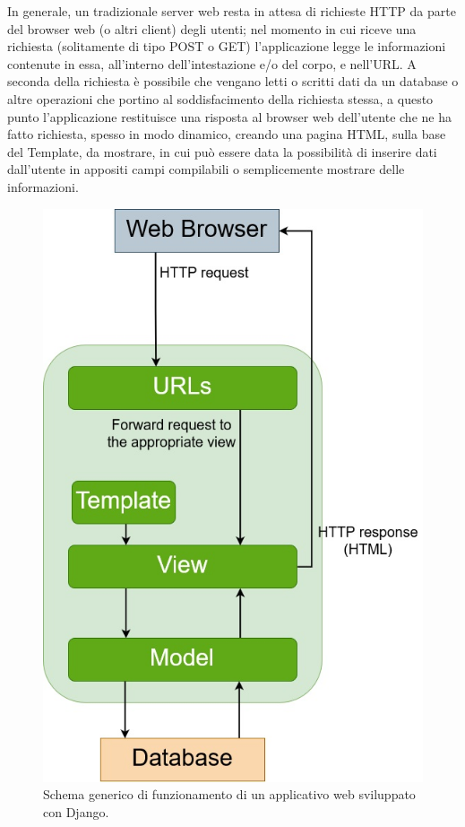 In generale, un tradizionale server web resta in attesa di richieste HTTP da parte del browser web (o altri client) degli utenti; nel momento in cui riceve 
una richiesta (solitamente di tipo POST o GET) 
l'applicazione legge le informazioni contenute in essa, all'interno dell'intestazione e/o del corpo, e nell'URL. A seconda della richiesta è possibile che 
vengano letti o scritti dati da un database o altre operazioni che portino al soddisfacimento della richiesta stessa, a questo punto l'applicazione restituisce una 
risposta al browser web dell'utente che ne ha fatto richiesta, spesso in modo dinamico, creando una pagina HTML, sulla base del Template,
da mostrare, in cui può essere data la possibilità di inserire dati dall'utente in appositi campi compilabili o semplicemente mostrare delle informazioni.
%
\newpage
%
\begin{figure}[ht!]
    \centering
    \includegraphics[scale=0.5]{images/Django_doc.jpg}
    \caption[Schema di funzionamento di un applicativo web in Django]{Schema generico di funzionamento di un applicativo web sviluppato con Django.}
    \label{fig:django_doc}
\end{figure}
